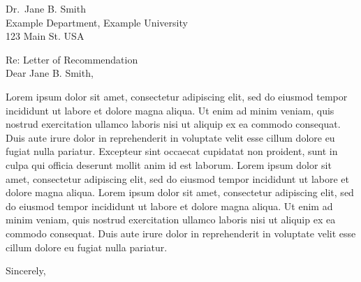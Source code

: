 \documentclass[11pt]{letter}
\date{\letterDate}
\newcommand{\titleAddressee}{Dr.}
\newcommand{\nameAddressee}{Jane B. Smith}
\newcommand{\departmentAddressee}{Example Department}
\newcommand{\instituteAddressee}{Example University}
\newcommand{\streetAddressee}{123 Main St. USA}
\newcommand{\letterSubject}{Re: Letter of Recommendation}
\begin{document}
\begin{letter}{
  \titleAddressee\ \nameAddressee\\
  \departmentAddressee, \instituteAddressee\\
  \streetAddressee
}

\opening{
    \letterSubject
    \vspace{1em}\\
    Dear \nameAddressee,
}

\thispagestyle{fancy}

Lorem ipsum dolor sit amet, consectetur adipiscing elit, sed do eiusmod tempor incididunt ut labore et dolore magna aliqua. Ut enim ad minim veniam, quis nostrud exercitation ullamco laboris nisi ut aliquip ex ea commodo consequat. Duis aute irure dolor in reprehenderit in voluptate velit esse cillum dolore eu fugiat nulla pariatur. Excepteur sint occaecat cupidatat non proident, sunt in culpa qui officia deserunt mollit anim id est laborum. Lorem ipsum dolor sit amet, consectetur adipiscing elit, sed do eiusmod tempor incididunt ut labore et dolore magna aliqua. Lorem ipsum dolor sit amet, consectetur adipiscing elit, sed do eiusmod tempor incididunt ut labore et dolore magna aliqua. Ut enim ad minim veniam, quis nostrud exercitation ullamco laboris nisi ut aliquip ex ea commodo consequat. Duis aute irure dolor in reprehenderit in voluptate velit esse cillum dolore eu fugiat nulla pariatur.

\closing{Sincerely,}

\end{letter}
\end{document}
